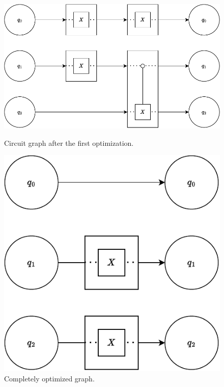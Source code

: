 \begin{figure}[htp]
    \centering     
    \begin{minipage}{.6\textwidth}
        \centering     
        \includegraphics[width=\textwidth]{../figures/drawio/circuit_graph_optimized_firststep.pdf}
        \caption{Circuit graph after the first optimization.}
        \label{fig:circuit_graph_first_optimized}
    \end{minipage}
    \hfill
    \begin{minipage}{.35\textwidth}
        \centering     
        \includegraphics[width=\textwidth]{../figures/drawio/circuit_graph_optimized_complete.pdf}
        \caption{Completely optimized graph.}
        \label{fig:circuit_graph_optimized_complete}
    \end{minipage}
\end{figure}

